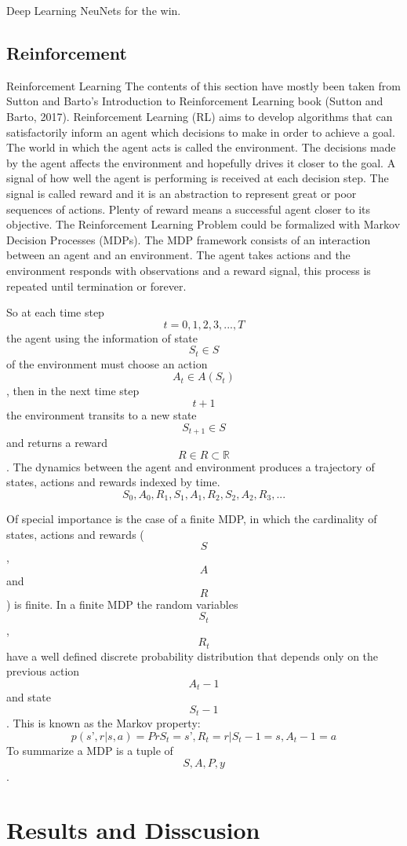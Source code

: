 \documentclass[
]{book}
\begin{document}
Deep Learning
NeuNets for the win.

\hypertarget{reinforcement-1}{%
\section{Reinforcement}\label{reinforcement-1}}

Reinforcement Learning
The contents of this section have mostly been taken from Sutton and Barto's Introduction to Reinforcement Learning book (Sutton and Barto, 2017).
Reinforcement Learning (RL) aims to develop algorithms that can satisfactorily inform an agent which decisions to make in order to achieve a goal. The world in which the agent acts is called the environment. The decisions made by the agent affects the environment and hopefully drives it closer to the goal. A signal of how well the agent is performing is received at each decision step. The signal is called reward and it is an abstraction to represent great or poor sequences of actions. Plenty of reward means a successful agent closer to its objective.
The Reinforcement Learning Problem could be formalized with Markov Decision Processes (MDPs). The MDP framework consists of an interaction between an agent and an environment. The agent takes actions and the environment responds with observations and a reward signal, this process is repeated until termination or forever.

So at each time step \[t=0,1,2,3,...,T\] the agent using the information of state \[S_t \in S\] of the environment must choose an action \[A_t \in A(S_t)\], then in the next time step \[t+1\] the environment transits to a new state \[S_{t+1} \in S\] and returns a reward \[R \in R \subset \mathds{R}\]. The dynamics between the agent and environment produces a trajectory of states, actions and rewards indexed by time.
\[ S_0, A_0, R_1, S_1, A_1, R_2, S_2, A_2, R_3, ...\]

Of special importance is the case of a finite MDP, in which the cardinality of states, actions and rewards (\[S \], \[A\] and \[R\]) is finite.
In a finite MDP the random variables \[S_t\], \[R_t\] have a well defined discrete probability distribution that depends only on the previous action \[A_t-1\] and state \[S_t-1\]. This is known as the Markov property:
\[ p(s’, r | s, a) = Pr{S_t=s’, R_t=r | S_t-1=s, A_t-1=a} \]
To summarize a MDP is a tuple of \[S, A, P, y\].

\hypertarget{results-and-disscusion}{%
\chapter{Results and Disscusion}\label{results-and-disscusion}}
\end{document}
